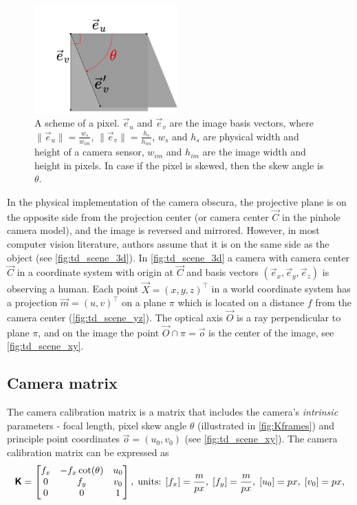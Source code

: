 \begin{figure}[ht]
  \centering
  \includegraphics[width=0.49\textwidth]{graphics/pixel.png}
  \caption[A scheme of a pixel skew.]{A scheme of a pixel. $\vec{e}_u$ and $\vec{e}_v$ are the image basis vectors, where $\lVert \vec{e}_u \rVert = \frac{w_s}{w_{im}}$, $\lVert \vec{e}_v \rVert = \frac{h_s}{h_{im}}$, $w_s$ and $h_s$ are physical width and height of a camera sensor, $w_{im}$ and $h_{im}$ are the image width and height in pixels. In case if the pixel is skewed, then the skew angle is $\theta$.}
  \label{fig:Kframes}
\end{figure}

In the physical implementation of the camera obscura, the projective plane is on the opposite side from the projection center (or camera center $\vec{C}$ in the pinhole camera model), and the image is reversed and mirrored. 
However, in most computer vision literature, authors assume that it is on the same side as the object (see \autoref{fig:td_scene_3d}).
In \autoref{fig:td_scene_3d} a camera with camera center $\vec{C}$ in a coordinate system with origin at $\vec{C}$ and basis vectors $(\vec{e}_x, \vec{e}_y, \vec{e}_z)$ is observing a human. 
Each point $\vec{X} = (x, y, z)^\top$ in a world coordinate system has a projection $\vec{m} = (u, v)^\top$ on a plane $\pi$ which is located on a distance $f$ from the camera center (\autoref{fig:td_scene_yz}). 
The optical axis $\vec{O}$ is a ray perpendicular to plane $\pi$, and on the image the point $ \vec{O} \cap \pi = \vec{o}$ is the center of the image, see \autoref{fig:td_scene_xy}.

\subsection{Camera matrix}
The camera calibration matrix is a matrix that includes the camera's \textit{intrinsic} parameters - focal length, pixel skew angle $\theta$ (illustrated in \autoref{fig:Kframes}) and principle point coordinates $\vec{o} = (u_0, v_0)$ (see \autoref{fig:td_scene_xy}).
The camera calibration matrix can be expressed as
\begin{equation}
    \pmb{\mathsf{K}} = \begin{bmatrix}
        f_x & -f_x \cot(\theta) & u_0 \\
        0 & f_y & v_0 \\
        0 & 0 & 1 \\
    \end{bmatrix},
    \textrm{\;units: } [f_x]=\frac{m}{px},\; [f_y]=\frac{m}{px},\; [u_0]=px,\; [v_0]=px,
\end{equation}

